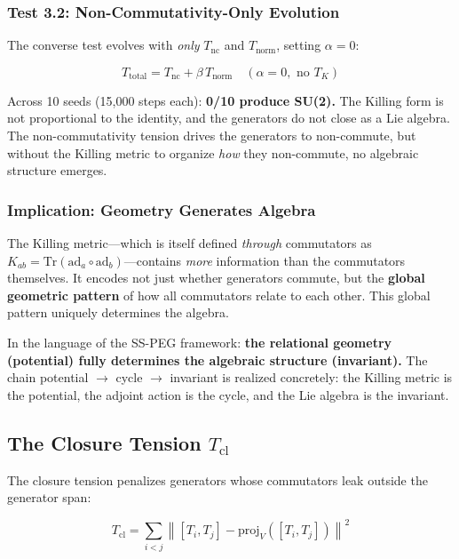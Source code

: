 \subsubsection{Test 3.2: Non-Commutativity-Only Evolution}

The converse test evolves with \textit{only} $T_{\mathrm{nc}}$ and $T_{\mathrm{norm}}$, setting $\alpha = 0$:

\begin{equation}
T_{\mathrm{total}} = T_{\mathrm{nc}} + \beta \, T_{\mathrm{norm}} \quad (\alpha = 0, \text{ no } T_K)
\end{equation}

Across 10 seeds (15,000 steps each): \textbf{0/10 produce SU(2).} The Killing form is not proportional to the identity, and the generators do not close as a Lie algebra. The non-commutativity tension drives the generators to non-commute, but without the Killing metric to organize \textit{how} they non-commute, no algebraic structure emerges.

\subsubsection{Implication: Geometry Generates Algebra}

The Killing metric---which is itself defined \textit{through} commutators as $K_{ab} = \mathrm{Tr}(\mathrm{ad}_a \circ \mathrm{ad}_b)$---contains \textit{more} information than the commutators themselves. It encodes not just whether generators commute, but the \textbf{global geometric pattern} of how all commutators relate to each other. This global pattern uniquely determines the algebra.

In the language of the SS-PEG framework: \textbf{the relational geometry (potential) fully determines the algebraic structure (invariant).} The chain potential $\to$ cycle $\to$ invariant is realized concretely: the Killing metric is the potential, the adjoint action is the cycle, and the Lie algebra is the invariant.

\subsection{The Closure Tension $T_{\mathrm{cl}}$}\label{sec:closure_tension}

The closure tension penalizes generators whose commutators leak outside the generator span:

\begin{equation}
T_{\mathrm{cl}} = \sum_{i < j} \left\| [T_i, T_j] - \mathrm{proj}_{V}([T_i, T_j]) \right\|^2
\end{equation}

